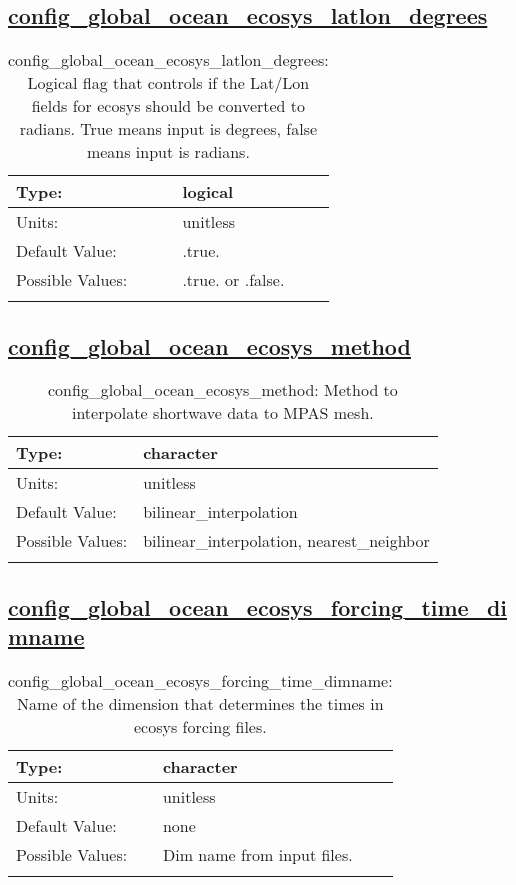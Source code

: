 \subsection[config\_global\_ocean\_ecosys\_latlon\_degrees]{\hyperref[sec:nm_tab_global_ocean]{config\_global\_ocean\_ecosys\_latlon\_degrees}}
\label{subsec:nm_sec_config_global_ocean_ecosys_latlon_degrees}
\begin{center}
\begin{longtable}{| p{2.0in} || p{4.0in} |}
    \hline
    Type: & logical \\
    \hline
    Units: & \si{unitless} \\
    \hline
    Default Value: & .true. \\
    \hline
    Possible Values: & .true. or .false. \\
    \hline
    \caption{config\_global\_ocean\_ecosys\_latlon\_degrees: Logical flag that controls if the Lat/Lon fields for ecosys should be converted to radians. True means input is degrees, false means input is radians.}
\end{longtable}
\end{center}
\subsection[config\_global\_ocean\_ecosys\_method]{\hyperref[sec:nm_tab_global_ocean]{config\_global\_ocean\_ecosys\_method}}
\label{subsec:nm_sec_config_global_ocean_ecosys_method}
\begin{center}
\begin{longtable}{| p{2.0in} || p{4.0in} |}
    \hline
    Type: & character \\
    \hline
    Units: & \si{unitless} \\
    \hline
    Default Value: & bilinear\_interpolation \\
    \hline
    Possible Values: & bilinear\_interpolation, nearest\_neighbor \\
    \hline
    \caption{config\_global\_ocean\_ecosys\_method: Method to interpolate shortwave data to MPAS mesh.}
\end{longtable}
\end{center}
\subsection[config\_global\_ocean\_ecosys\_forcing\_time\_dimname]{\hyperref[sec:nm_tab_global_ocean]{config\_global\_ocean\_ecosys\_forcing\_time\_dimname}}
\label{subsec:nm_sec_config_global_ocean_ecosys_forcing_time_dimname}
\begin{center}
\begin{longtable}{| p{2.0in} || p{4.0in} |}
    \hline
    Type: & character \\
    \hline
    Units: & \si{unitless} \\
    \hline
    Default Value: & none \\
    \hline
    Possible Values: & Dim name from input files. \\
    \hline
    \caption{config\_global\_ocean\_ecosys\_forcing\_time\_dimname: Name of the dimension that determines the times in ecosys forcing files.}
\end{longtable}
\end{center}
